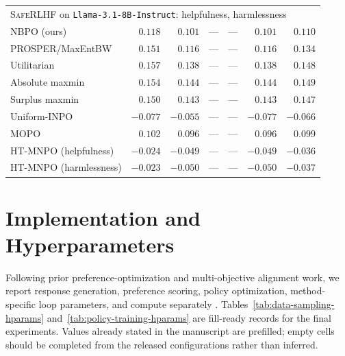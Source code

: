 \documentclass{article}
\theoremstyle{remark}
\theoremstyle{plain}
\newcommand{\NBPO}{\textsc{NBPO}}
\begin{document}
\begin{table}[t]
\begin{tabular}{lrrrrrr}
\midrule
\multicolumn{7}{l}{\textsc{SafeRLHF} on \texttt{Llama-3.1-8B-Instruct}: helpfulness, harmlessness}\\
\NBPO{} (ours) & $0.118$ & $0.101$ & --- & --- & $0.101$ & $0.110$\\
PROSPER/MaxEntBW & $0.151$ & $0.116$ & --- & --- & $0.116$ & $0.134$\\
Utilitarian & $0.157$ & $0.138$ & --- & --- & $0.138$ & $0.148$\\
Absolute maxmin & $0.154$ & $0.144$ & --- & --- & $0.144$ & $0.149$\\
Surplus maxmin & $0.150$ & $0.143$ & --- & --- & $0.143$ & $0.147$\\
Uniform-INPO & $-0.077$ & $-0.055$ & --- & --- & $-0.077$ & $-0.066$\\
MOPO & $0.102$ & $0.096$ & --- & --- & $0.096$ & $0.099$\\
HT-MNPO (helpfulness) & $-0.024$ & $-0.049$ & --- & --- & $-0.049$ & $-0.036$\\
HT-MNPO (harmlessness) & $-0.023$ & $-0.050$ & --- & --- & $-0.050$ & $-0.037$\\
\bottomrule
\end{tabular}
\end{table}

\section{Implementation and Hyperparameters}
\label{app:hyperparameters}
Following prior preference-optimization and multi-objective alignment work, we report response generation, preference scoring, policy optimization, method-specific loop parameters, and compute separately \citep{munos2024nash,zhang2025iterative,zhong2024panacea,zhang2026prosper}. Tables~\ref{tab:data-sampling-hparams} and~\ref{tab:policy-training-hparams} are fill-ready records for the final experiments. Values already stated in the manuscript are prefilled; empty cells should be completed from the released configurations rather than inferred.
\end{document}
